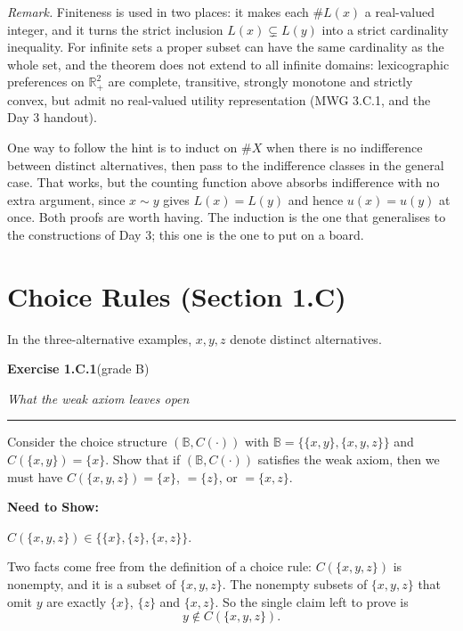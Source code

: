 \documentclass[12pt]{article}
\newcommand{\exercise}[3]{%
  \par\penalty-250\bigskip\Needspace{8\baselineskip}
  \noindent\textbf{\large Exercise #1}\quad\textnormal{(grade #2)}%
  \par\nobreak\smallskip
  \noindent\textit{#3}%
  \par\nobreak\smallskip
  \noindent\rule{\linewidth}{0.4pt}%
  \par\nobreak\smallskip}
\newenvironment{statement}{\par\medskip}{\par\medskip}
\newenvironment{nts}
  {\par\medskip\Needspace{3\baselineskip}%
   \noindent\textbf{Need to Show:}\par\nobreak\smallskip}
  {\par\medskip}
\newenvironment{remark}
  {\par\medskip\noindent\textit{Remark.}\enspace}
  {\par\medskip}
\begin{document}
\begin{remark}
  Finiteness is used in two places: it makes each $\#L(x)$ a real-valued
  integer, and it turns the strict inclusion $L(x)\subsetneq L(y)$ into a
  strict cardinality inequality. For infinite sets a proper subset can have the
  same cardinality as the whole set, and the theorem does not extend to all
  infinite domains: lexicographic preferences on $\mathbb R_{+}^{2}$ are
  complete, transitive, strongly monotone and strictly convex, but admit no
  real-valued utility representation (MWG 3.C.1, and the Day 3 handout).

  One way to follow the hint is to induct on $\#X$ when there is no
  indifference between distinct alternatives, then pass to the indifference
  classes in the general case. That works, but the
  counting function above absorbs indifference with no extra argument, since
  $x\sim y$ gives $L(x)=L(y)$ and hence $u(x)=u(y)$ at once. Both proofs are
  worth having. The induction is the one that generalises to the constructions of
  Day 3; this one is the one to put on a board.
\end{remark}

\newpage
\section*{Choice Rules (Section 1.C)}

In the three-alternative examples, $x,y,z$ denote distinct alternatives.

\exercise{1.C.1}{B}{What the weak axiom leaves open}

\begin{statement}
  Consider the choice structure $(\mathbb B,C(\cdot))$ with
  $\mathbb B=\bigl\{\{x,y\},\{x,y,z\}\bigr\}$ and $C(\{x,y\})=\{x\}$. Show that
  if $(\mathbb B,C(\cdot))$ satisfies the weak axiom, then we must have
  $C(\{x,y,z\})=\{x\}$, $=\{z\}$, or $=\{x,z\}$.
\end{statement}

\begin{nts}
  $C(\{x,y,z\})\in\bigl\{\{x\},\{z\},\{x,z\}\bigr\}$.
  \medskip

  \noindent
  Two facts come free from the definition of a choice rule: $C(\{x,y,z\})$ is
  nonempty, and it is a subset of $\{x,y,z\}$. The nonempty subsets of
  $\{x,y,z\}$ that omit $y$ are exactly $\{x\}$, $\{z\}$ and $\{x,z\}$. So the
  single claim left to prove is
  \[
  y\notin C(\{x,y,z\}).
  \]
\end{nts}
\end{document}
